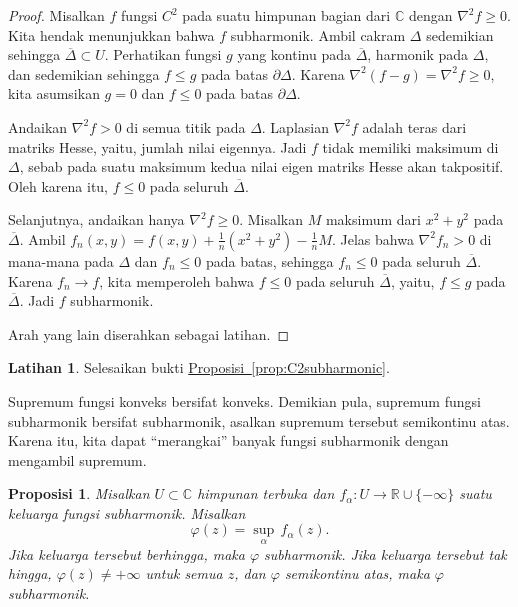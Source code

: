 \documentclass[12pt,openany]{book}
\newcommand{\C}{{\mathbb{C}}}
\newcommand{\R}{{\mathbb{R}}}
\newcommand{\myquote}[1]{``#1''}
\theoremstyle{plain}
\newtheorem{prop}[thm]{Proposisi}
\theoremstyle{remark}
\theoremstyle{definition}
\newenvironment{exbox}{%
    \def\FrameCommand{\vrule width 1pt \relax\hspace{10pt}}%
    \MakeFramed{\advance\hsize-\width\FrameRestore}%
}{%
    \endMakeFramed
}
\theoremstyle{exercise}
\newtheorem{exercise}{Latihan}[section]
\theoremstyle{example}
\newcommand{\propref}[1]{\hyperref[#1]{Proposisi~\ref*{#1}}}
\begin{document}
\begin{proof}
Misalkan $f$ fungsi $C^2$ pada suatu himpunan bagian dari $\C$
dengan $\nabla^2 f \geq 0$.  Kita hendak menunjukkan bahwa $f$ subharmonik.
Ambil cakram $\Delta$ sedemikian sehingga $\overline{\Delta} \subset U$.
Perhatikan fungsi
$g$ yang kontinu pada $\overline{\Delta}$,
harmonik pada $\Delta$, dan sedemikian sehingga
$f \leq g$ pada batas $\partial \Delta$.  Karena
$\nabla^2 (f-g) = \nabla^2 f \geq 0$, kita asumsikan $g = 0$ dan $f \leq 0$
pada batas $\partial \Delta$. 

Andaikan $\nabla^2 f > 0$ di semua titik pada $\Delta$.
Laplasian $\nabla^2 f$ adalah teras dari matriks Hesse,
yaitu, jumlah nilai eigennya.  Jadi $f$ tidak memiliki maksimum 
di $\Delta$, sebab pada suatu maksimum kedua nilai eigen matriks Hesse
akan takpositif.
Oleh karena itu, $f \leq 0$ pada seluruh $\overline{\Delta}$.

Selanjutnya, andaikan hanya $\nabla^2 f \geq 0$.
Misalkan $M$ maksimum dari $x^2+y^2$ pada $\overline{\Delta}$.
Ambil $f_n(x,y) = f(x,y) + \frac{1}{n}
( x^2+y^2 ) - \frac{1}{n}M$.  Jelas bahwa $\nabla^2 f_n > 0$ di mana-mana pada
$\Delta$ dan
$f_n \leq 0$ pada batas, sehingga $f_n \leq 0$ 
pada seluruh $\overline{\Delta}$.  Karena $f_n \to f$, kita memperoleh bahwa
$f \leq 0$ pada seluruh $\overline{\Delta}$, yaitu, $f \leq g$ pada
$\overline{\Delta}$.
Jadi $f$ subharmonik.

Arah yang lain diserahkan sebagai latihan.
\end{proof}

\begin{exbox}
\begin{exercise}
Selesaikan bukti \propref{prop:C2subharmonic}.
\end{exercise}
\end{exbox}

Supremum fungsi konveks bersifat konveks.
Demikian pula,
supremum fungsi subharmonik bersifat subharmonik, asalkan
supremum tersebut semikontinu atas.  Karena itu, kita dapat
\myquote{merangkai}
banyak fungsi subharmonik dengan mengambil supremum.

\begin{prop}
Misalkan $U \subset \C$ himpunan terbuka dan $f_\alpha \colon U \to \R \cup \{ -\infty \}$
suatu keluarga fungsi subharmonik.  Misalkan
\begin{equation*}
\varphi(z) = \sup_\alpha\, f_\alpha(z) .
\end{equation*}
Jika keluarga tersebut berhingga, maka $\varphi$ subharmonik.
Jika keluarga tersebut tak hingga, $\varphi(z) \neq +\infty$ untuk
semua $z$, dan $\varphi$
semikontinu atas, maka $\varphi$ subharmonik.
\end{prop}
\end{document}
